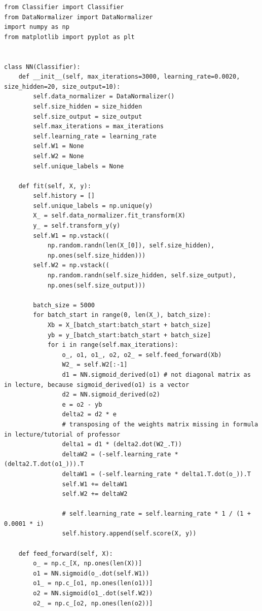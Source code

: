 \begin{lstlisting}[style=py]
from Classifier import Classifier
from DataNormalizer import DataNormalizer
import numpy as np
from matplotlib import pyplot as plt


class NN(Classifier):
    def __init__(self, max_iterations=3000, learning_rate=0.0020, size_hidden=20, size_output=10):
        self.data_normalizer = DataNormalizer()
        self.size_hidden = size_hidden
        self.size_output = size_output
        self.max_iterations = max_iterations
        self.learning_rate = learning_rate
        self.W1 = None
        self.W2 = None
        self.unique_labels = None

    def fit(self, X, y):
        self.history = []
        self.unique_labels = np.unique(y)
        X_ = self.data_normalizer.fit_transform(X)
        y_ = self.transform_y(y)
        self.W1 = np.vstack((
            np.random.randn(len(X_[0]), self.size_hidden),
            np.ones(self.size_hidden)))
        self.W2 = np.vstack((
            np.random.randn(self.size_hidden, self.size_output),
            np.ones(self.size_output)))

        batch_size = 5000
        for batch_start in range(0, len(X_), batch_size):
            Xb = X_[batch_start:batch_start + batch_size]
            yb = y_[batch_start:batch_start + batch_size]
            for i in range(self.max_iterations):
                o_, o1, o1_, o2, o2_ = self.feed_forward(Xb)
                W2_ = self.W2[:-1]
                d1 = NN.sigmoid_derived(o1) # not diagonal matrix as in lecture, because sigmoid_derived(o1) is a vector
                d2 = NN.sigmoid_derived(o2)
                e = o2 - yb
                delta2 = d2 * e
                # transposing of the weights matrix missing in formula in lecture/tutorial of professor
                delta1 = d1 * (delta2.dot(W2_.T))
                deltaW2 = (-self.learning_rate * (delta2.T.dot(o1_))).T
                deltaW1 = (-self.learning_rate * delta1.T.dot(o_)).T
                self.W1 += deltaW1
                self.W2 += deltaW2

                # self.learning_rate = self.learning_rate * 1 / (1 + 0.0001 * i)
                self.history.append(self.score(X, y))

    def feed_forward(self, X):
        o_ = np.c_[X, np.ones(len(X))]
        o1 = NN.sigmoid(o_.dot(self.W1))
        o1_ = np.c_[o1, np.ones(len(o1))]
        o2 = NN.sigmoid(o1_.dot(self.W2))
        o2_ = np.c_[o2, np.ones(len(o2))]


\end{lstlisting}
